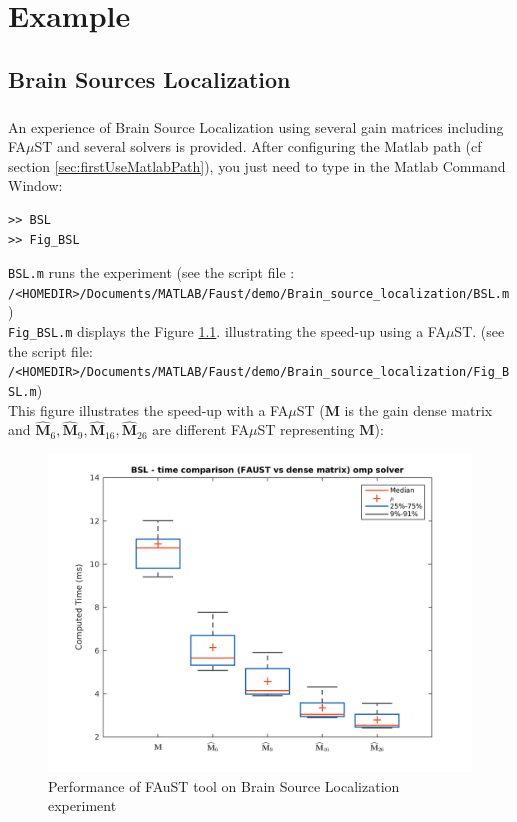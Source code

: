 \chapter{Example}\label{sec:example}

\section{Brain Sources Localization}\label{sec:BSL_example}
%



\paragraph{} An experience of Brain Source Localization using several gain matrices including FA$\mu$ST and several solvers is provided. After configuring the Matlab path (cf section \ref{sec:firstUseMatlabPath}), you just need to type in the Matlab Command Window:
\lstset{style=customMatlab}
\begin{lstlisting}
>> BSL
>> Fig_BSL
\end{lstlisting}

\texttt{BSL.m} runs the experiment (see the script file :\\
\texttt{/<HOMEDIR>/Documents/MATLAB/Faust/demo/Brain\_source\_localization/BSL.m})\\
\texttt{Fig\_BSL.m} displays the Figure \ref{fig:BSL}. illustrating the speed-up using a FA$\mu$ST. (see the script file:\\
\texttt{/<HOMEDIR>/Documents/MATLAB/Faust/demo/Brain\_source\_localization/Fig\_BSL.m}) \\

This figure illustrates the speed-up with a FA$\mu$ST ($\mathbf{M}$ is the gain dense matrix and $\widehat{\mathbf{M}}_{6},\widehat{\mathbf{M}}_{9},\widehat{\mathbf{M}}_{16},\widehat{\mathbf{M}}_{26}$ are different FA$\mu$ST representing  $\mathbf{M}$):


\begin{figure}[!h] %
\centering
\includegraphics[scale=0.7]{images/BSL.png}
\caption{Performance of FAuST tool on Brain Source Localization experiment}
\label{fig:BSL}
\end{figure}

